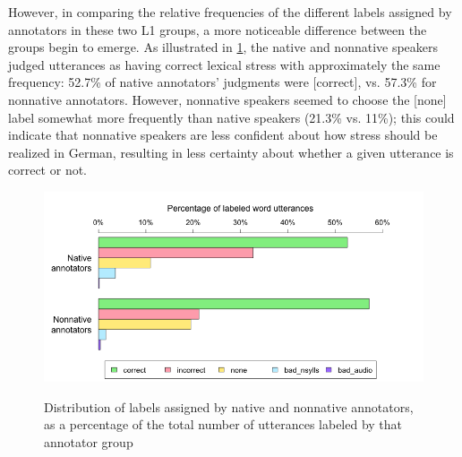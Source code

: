 		

		However, in comparing the relative frequencies of the different labels assigned by annotators in these two L1 groups, a more noticeable difference between the groups begin to emerge. As illustrated in \cref{fig:agreement:l1bars}, the native and nonnative speakers judged utterances as having correct lexical stress with approximately the same frequency: 52.7\% of native annotators' judgments were [correct], vs. 57.3\% for nonnative annotators. However, nonnative speakers seemed to choose the [none]
		label somewhat more frequently than native speakers (21.3\% vs. 11\%); this could indicate that nonnative speakers are less confident about how stress should be realized in German, resulting in less certainty about whether a given utterance is correct or not. 
		
		
			\begin{figure}[htb]
				\centering
				\caption[Distribution of labels by annotator L1]{Distribution of labels assigned by native and nonnative annotators,
				as a percentage of the total number of utterances labeled by that annotator group 
				}
				\includegraphics[width=\textwidth]{img/plots/pctJudgmentsByL1-notStacked}
				\label{fig:agreement:l1bars}
			\end{figure}
			
	
			
